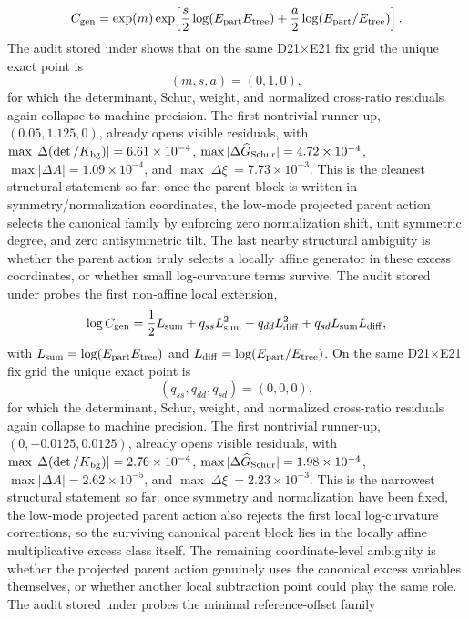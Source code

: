 \documentclass[aps,prd,onecolumn,notitlepage,nofootinbib,superscriptaddress,11pt,floatfix]{revtex4-2}
\begin{document}
\[
C_{\rm gen}
=
\exp(m)\exp\!\left[\frac{s}{2}\log(E_{\rm part}E_{\rm tree})
+\frac{a}{2}\log(E_{\rm part}/E_{\rm tree})\right].
\]
The audit stored under  shows that on the same D21$\times$E21 fix grid the unique exact point is
\[
(m,s,a)=(0,1,0),
\]
for which the determinant, Schur, weight, and normalized cross-ratio residuals again collapse to machine precision. The first nontrivial runner-up, $(0.05,1.125,0)$, already opens visible residuals, with $\max|\Delta(\det/K_{\rm bg})|=6.61\times10^{-4}$, $\max|\Delta \widehat G_{\rm Schur}|=4.72\times10^{-4}$, $\max|\Delta A|=1.09\times10^{-4}$, and $\max|\Delta \xi|=7.73\times10^{-3}$. This is the cleanest structural statement so far: once the parent block is written in symmetry/normalization coordinates, the low-mode projected parent action selects the canonical family by enforcing zero normalization shift, unit symmetric degree, and zero antisymmetric tilt.
The last nearby structural ambiguity is whether the parent action truly selects a locally affine generator in these excess coordinates, or whether small log-curvature terms survive. The audit stored under  probes the first non-affine local extension,
\[
\log C_{\rm gen}
=
\frac12 L_{\rm sum}
+q_{ss}L_{\rm sum}^2
+q_{dd}L_{\rm diff}^2
+q_{sd}L_{\rm sum}L_{\rm diff},
\]
with $L_{\rm sum}=\log(E_{\rm part}E_{\rm tree})$ and $L_{\rm diff}=\log(E_{\rm part}/E_{\rm tree})$. On the same D21$\times$E21 fix grid the unique exact point is
\[
(q_{ss},q_{dd},q_{sd})=(0,0,0),
\]
for which the determinant, Schur, weight, and normalized cross-ratio residuals again collapse to machine precision. The first nontrivial runner-up, $(0,-0.0125,0.0125)$, already opens visible residuals, with $\max|\Delta(\det/K_{\rm bg})|=2.76\times10^{-4}$, $\max|\Delta \widehat G_{\rm Schur}|=1.98\times10^{-4}$, $\max|\Delta A|=2.62\times10^{-5}$, and $\max|\Delta \xi|=2.23\times10^{-3}$. This is the narrowest structural statement so far: once symmetry and normalization have been fixed, the low-mode projected parent action also rejects the first local log-curvature corrections, so the surviving canonical parent block lies in the locally affine multiplicative excess class itself.
The remaining coordinate-level ambiguity is whether the projected parent action genuinely uses the canonical excess variables themselves, or whether another local subtraction point could play the same role. The audit stored under  probes the minimal reference-offset family
\end{document}
